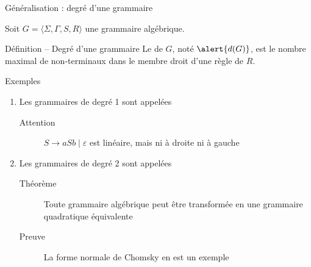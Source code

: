 
\begingroup

\begin{frame}{Généralisation : degré d'une grammaire}
  
  Soit $G = \langle \Sigma, \Gamma, S, R \rangle$ une grammaire algébrique.\\
  \begin{block}{Définition -- Degré d'une grammaire}
    Le  de $G$, noté $\alert{d(G)}$,
    est le nombre maximal de non-terminaux dans le membre droit d'une règle de $R$. 
  \end{block}

  \begin{exampleblock}{Exemples}
    \begin{enumerate}
    \item Les grammaires de \alert{degré 1} sont appelées 
      \begin{description}
      \item[Attention] \alert{$S \rightarrow aSb \mid \varepsilon$} est linéaire, mais ni à droite ni à gauche
      \end{description}
    \item Les grammaires de \alert{degré 2} sont appelées 
      \begin{description}
      \item[Théorème] Toute grammaire algébrique peut être transformée en une grammaire quadratique équivalente 
      \item[Preuve] La forme normale de Chomsky en est un exemple
      \end{description}
    \end{enumerate}
  \end{exampleblock}
\end{frame}


\endgroup
